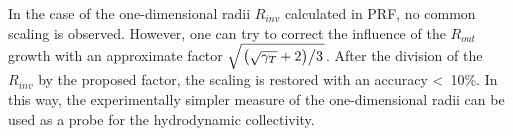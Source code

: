 \documentclass[landscape,final,a3paper,fontscale=1]{baposter}
\begin{document}
\begin{poster}
{\begin{multicols}{2}
  In the case of the one-dimensional radii $R_{inv}$ calculated in PRF, no common scaling is observed.
  However, one can try to correct the influence of the $R_{out}$ growth with an approximate factor $\sqrt{ \left. \left( \sqrt{\gamma_T} + 2 \right) \middle/ 3 \right. }$.
  After the division of the $R_{inv}$ by the proposed factor, the scaling is restored with an accuracy <~10\%.
  In this way, the experimentally simpler measure of the one-dimensional radii can be used as a probe for the hydrodynamic collectivity.
  \end{multicols}
  }

\end{poster}
\end{document}
